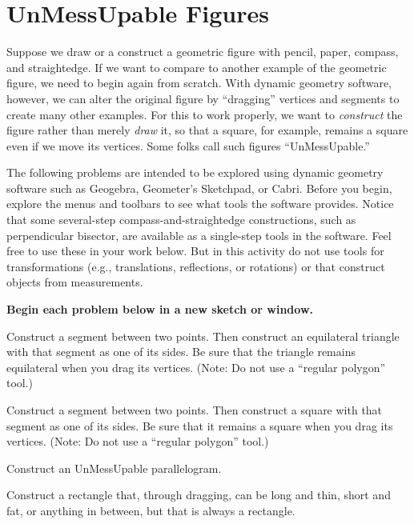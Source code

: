 \newpage

\section{UnMessUpable Figures}
Suppose we draw or a construct a geometric figure with pencil, paper, compass, and straightedge.  If we want to compare to another example of the geometric figure, we need to begin again from scratch.  With dynamic geometry software, however, we can alter the original figure by ``dragging'' vertices and segments to create many other examples.  For this to work properly, we want to \emph{construct} the figure rather than merely \emph{draw} it, so that a square, for example, remains a square even if we move its vertices.  Some folks call such figures ``UnMessUpable.'' 

The following problems are intended to be explored using dynamic geometry software such as Geogebra, Geometer's Sketchpad, or Cabri.  Before you begin, explore the menus and toolbars to see what tools the software provides.  Notice that some several-step compass-and-straightedge constructions, such as perpendicular bisector, are available as a single-step tools in the software.  Feel free to use these in your work below.  But in this activity do not use tools for transformations (e.g., translations, reflections, or rotations) or that construct objects from measurements.  

\vspace{0.1in}
\textbf{Begin each problem below in a new sketch or window.}

\begin{prob}
Construct a segment between two points.  Then construct an equilateral triangle with that segment as one of its sides.  Be sure that the triangle remains equilateral when you drag its vertices.   (Note:  Do not use a ``regular polygon'' tool.)
\end{prob}

\begin{prob}
Construct a segment between two points.  Then construct a square with that segment as one of its sides.  Be sure that it remains a square when you drag its vertices.  (Note:  Do not use a ``regular polygon'' tool.)
\end{prob}

\begin{prob}
Construct an UnMessUpable parallelogram.  
\end{prob}

\begin{prob}
Construct a rectangle that, through dragging, can be long and thin, short and fat, or anything in between, but that is always a rectangle.
\end{prob}

